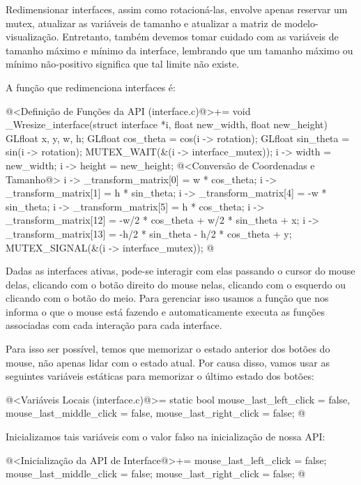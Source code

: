 
Redimensionar interfaces, assim como rotacioná-las, envolve apenas
reservar um mutex, atualizar as variáveis de tamanho e atualizar a
matriz de modelo-visualização. Entretanto, também devemos tomar
cuidado com as variáveis de tamanho máximo e mínimo da interface,
lembrando que um tamanho máximo ou mínimo não-positivo significa que
tal limite não existe.

A função que redimenciona interfaces é:

\iniciocodigo
@<Definição de Funções da API (interface.c)@>+=
void _Wresize_interface(struct interface *i, float new_width, float new_height){
  GLfloat x, y, w, h;
  GLfloat cos_theta = cos(i -> rotation);
  GLfloat sin_theta = sin(i -> rotation);
  MUTEX_WAIT(&(i -> interface_mutex));
  i -> width = new_width;
  i -> height = new_height;
  @<Conversão de Coordenadas e Tamanho@>
  i -> _transform_matrix[0] = w * cos_theta;
  i -> _transform_matrix[1] = h * sin_theta;
  i -> _transform_matrix[4] = -w * sin_theta;
  i -> _transform_matrix[5] = h * cos_theta;
  i -> _transform_matrix[12] = -w/2 * cos_theta + w/2 * sin_theta + x;
  i -> _transform_matrix[13] = -h/2 * sin_theta - h/2 * cos_theta + y;
  MUTEX_SIGNAL(&(i -> interface_mutex));
}
@
\fimcodigo


Dadas as interfaces ativas, pode-se interagir com elas passando o
cursor do mouse delas, clicando com o botão direito do mouse nelas,
clicando com o esquerdo ou clicando com o botão do meio. Para
gerenciar isso usamos a função  que
nos informa o que o mouse está fazendo e automaticamente executa as
funções associadas com cada interação para cada interface.

Para isso ser possível, temos que memorizar o estado anterior dos
botões do mouse, não apenas lidar com o estado atual. Por causa disso,
vamos usar as seguintes variáveis estáticas para memorizar o último
estado dos botões:

\iniciocodigo
@<Variáveis Locais (interface.c)@>=
static bool mouse_last_left_click = false, mouse_last_middle_click = false,
  mouse_last_right_click = false;
@
\fimcodigo

Inicializamos tais variáveis com o valor falso na inicialização de
nossa API:

\iniciocodigo
@<Inicialização da API de Interface@>+=
mouse_last_left_click = false;
mouse_last_middle_click = false;
mouse_last_right_click = false;
@
\fimcodigo

